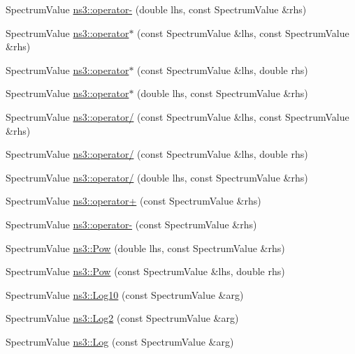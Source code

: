 \begin{DoxyCompactItemize}
\item 
Spectrum\+Value \hyperlink{namespacens3_ac0c2d1ada44d8dbfe98d719a3cfcf743}{ns3\+::operator-\/} (double lhs, const Spectrum\+Value \&rhs)
\item 
Spectrum\+Value \hyperlink{namespacens3_ae4e5234424fd3286aeea507a6c9f3888}{ns3\+::operator$\ast$} (const Spectrum\+Value \&lhs, const Spectrum\+Value \&rhs)
\item 
Spectrum\+Value \hyperlink{namespacens3_a503c2c84f8cc79a6bd8b1bf1ddcc94bb}{ns3\+::operator$\ast$} (const Spectrum\+Value \&lhs, double rhs)
\item 
Spectrum\+Value \hyperlink{namespacens3_a9e9215dd1bab11a9fbbbb0403bcdcbb5}{ns3\+::operator$\ast$} (double lhs, const Spectrum\+Value \&rhs)
\item 
Spectrum\+Value \hyperlink{namespacens3_aa53350ae818121bcf1cf6382848fb3cb}{ns3\+::operator/} (const Spectrum\+Value \&lhs, const Spectrum\+Value \&rhs)
\item 
Spectrum\+Value \hyperlink{namespacens3_ae170715cc432dd368014580fd3ff0d85}{ns3\+::operator/} (const Spectrum\+Value \&lhs, double rhs)
\item 
Spectrum\+Value \hyperlink{namespacens3_acee144de5ffcfb1863d8cd21ba4be2f4}{ns3\+::operator/} (double lhs, const Spectrum\+Value \&rhs)
\item 
Spectrum\+Value \hyperlink{namespacens3_af6d7ad175d41bc045d01d7582eb63c85}{ns3\+::operator+} (const Spectrum\+Value \&rhs)
\item 
Spectrum\+Value \hyperlink{namespacens3_a995c528405fae9fde684ec535ce01fbe}{ns3\+::operator-\/} (const Spectrum\+Value \&rhs)
\item 
Spectrum\+Value \hyperlink{namespacens3_a3133a629dbd335c8151508cc8b1046f5}{ns3\+::\+Pow} (double lhs, const Spectrum\+Value \&rhs)
\item 
Spectrum\+Value \hyperlink{namespacens3_a263efa70f571fbc6d8b13f838cb9f220}{ns3\+::\+Pow} (const Spectrum\+Value \&lhs, double rhs)
\item 
Spectrum\+Value \hyperlink{namespacens3_a852286d6b0f3471ea9fed2ec66bd4536}{ns3\+::\+Log10} (const Spectrum\+Value \&arg)
\item 
Spectrum\+Value \hyperlink{namespacens3_a7f903df44671c49879b8d6284024ffd3}{ns3\+::\+Log2} (const Spectrum\+Value \&arg)
\item 
Spectrum\+Value \hyperlink{namespacens3_ad5fc1a2db3d2b2f9f8d158ce63cffbad}{ns3\+::\+Log} (const Spectrum\+Value \&arg)
\end{DoxyCompactItemize}
